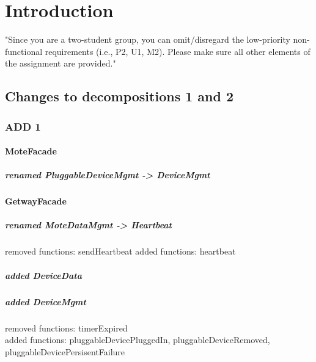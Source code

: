 \documentclass[english]{sareport}
\begin{document}
\maketitle

\tableofcontents
\dominilof
\fakelistoffigures

\chapter{Introduction}\label{ch:introduction}
"Since you are a two-student group, you can omit/disregard the low-priority
non-functional requirements (i.e., P2, U1, M2). Please make sure all other
elements of the assignment are provided."\\

\section{Changes to decompositions 1 and 2}
    \subsection{ADD 1}
        \subsubsection{MoteFacade}
            \paragraph{ renamed PluggableDeviceMgmt -> DeviceMgmt}

        \subsubsection{GetwayFacade}
            \paragraph{renamed MoteDataMgmt -> Heartbeat}
            removed functions: sendHeartbeat
            added functions: heartbeat 
            \paragraph{added DeviceData}
            \paragraph{added DeviceMgmt}
             removed functions: timerExpired\\
             added functions: pluggableDevicePluggedIn, pluggableDeviceRemoved, 
                              pluggableDevicePersisentFailure             
\end{document}

